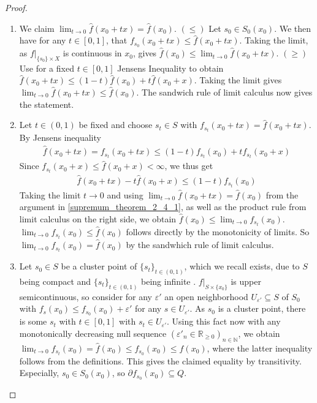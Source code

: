 \documentclass[10pt, leqno]{amsart}
\theoremstyle{definition}
\theoremstyle{remark}
\begin{document}
\begin{proof}
\begin{enumerate}[label=(\roman*), wide]
\begin{enumerate}[label=(\alph*), wide]
                \begin{enumerate}[label=\arabic*., wide]
                    \item \label{supremum_theorem_2_4_1} We claim \(\lim_{t \to 0} \hat{f}(x_0+tx) = \hat{f}(x_0)\). \((\leq)\) Let \(s_0 \in S_0(x_0)\). We then have for any \(t \in [0, 1]\), that \(f_{s_0}(x_0+tx) \leq \hat{f}(x_0+tx)\). Taking the limit, as \(f|_{\{s_0\} \times X}\) is continuous in \(x_0\), gives \(\hat{f}(x_0) \leq \lim_{t \to 0} \hat{f}(x_0+tx)\). \((\geq)\) Use for a fixed \(t \in [0,1]\) Jensens Inequality to obtain \(\hat{f}(x_0+tx) \leq (1-t)\hat{f}(x_0)+t\hat{f}(x_0+x)\). Taking the limit gives \(\lim_{t \to 0} \hat{f}(x_0+tx) \leq \hat{f}(x_0)\). The sandwich rule of limit calculus now gives the statement.
                    \item Let \(t \in (0, 1)\) be fixed and choose \(s_t \in S\) with \(f_{s_t}(x_0+tx) = \hat{f}(x_0+tx)\). By Jensens inequality
                    \begin{align}
                        \hat{f}(x_0+tx) = f_{s_t}(x_0+tx) \leq (1-t)f_{s_t}(x_0)+tf_{s_t}(x_0+x)
                    \end{align}
                    Since \(f_{s_t}(x_0+x) \leq \hat{f}(x_0+x) < \infty\), we thus get
                    \begin{align}
                        \hat{f}(x_0+tx)-t\hat{f}(x_0+x) \leq (1-t)f_{s_t}(x_0)
                    \end{align}
                    Taking the limit \(t \to 0\) and using \(\lim_{t \to 0} \hat{f}(x_0+tx) = \hat{f}(x_0)\) from the argument in \ref{supremum_theorem_2_4_1}, as well as the product rule from limit calculus on the right side, we obtain \(\hat{f}(x_0) \leq \lim_{t \to 0} f_{s_t}(x_0)\). \(\lim_{t \to 0} f_{s_t}(x_0) \leq \hat{f}(x_0)\) follows directly by the monotonicity of limits. So \(\lim_{t \to 0} f_{s_t}(x_0) = \hat{f}(x_0)\) by the sandwhich rule of limit calculus.
                    \item \label{supremum_theorem_2_4_3} Let \(s_0 \in S\) be a cluster point of \(\{s_t\}_{t \in (0, 1)}\), which we recall exists, due to \(S\) being compact and \(\{s_t\}_{t \in (0, 1)}\) being infinite \cite[p. 12]{IoffeTihomirov}. \(f|_{S \times \{x_0\}}\) is upper semicontinuous, so consider for any \(\varepsilon'\) an open neighborhood \(U_{\varepsilon'} \subseteq S\) of \(S_0\) with \(f_{s}(x_0) \leq f_{s_0}(x_0) + \varepsilon'\) for any \(s \in U_{\varepsilon'}\). As \(s_0\) is a cluster point, there is some \(s_t\) with \(t \in [0, 1]\) with \(s_t \in U_{\varepsilon'}\). Using this fact now with any monotonically decreasing null sequence \((\varepsilon'_n \in \mathbb{R}_{\geq 0})_{n \in \mathbb{N}}\), we obtain \(\lim_{t \to 0} f_{s_t}(x_0) = \hat{f}(x_0) \leq f_{s_0}(x_0) \leq \hat{f}(x_0)\), where the latter inequality follows from the definitions. This gives the claimed equality by transitivity. Especially, \(s_0 \in S_0(x_0)\), so \(\partial f_{s_0}(x_0) \subseteq Q\).

\end{enumerate}
\end{enumerate}
\end{enumerate}
\end{proof}
\end{document}
